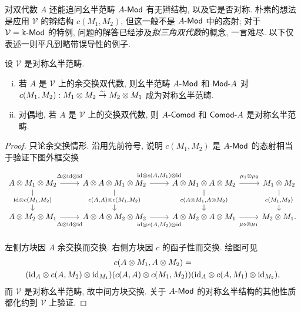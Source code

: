 对双代数 $A$ 还能追问幺半范畴 $A\text{-}\mathsf{Mod}$ 有无辫结构, 以及它是否对称. 朴素的想法是应用 $\mathcal{V}$ 的辫结构 $c(M_1, M_2)$, 但这一般不是 $A\text{-}\mathsf{Mod}$ 中的态射; 对于 $\mathcal{V} = \Bbbk\text{-}\mathsf{Mod}$ 的特例, 问题的解答已经涉及\emph{拟三角双代数}的概念, 一言难尽. 以下仅表述一则平凡到略带误导性的例子.

\begin{proposition}\label{prop:bialgebra-mod-symmetry}
	设 $\mathcal{V}$ 是对称幺半范畴.
	\begin{enumerate}[(i)]
		\item 若 $A$ 是 $\mathcal{V}$ 上的余交换双代数, 则幺半范畴 $A\text{-}\mathsf{Mod}$ 和 $\mathsf{Mod}\text{-}A$ 对 $c(M_1, M_2):  M_1 \otimes M_2 \stackrel{\sim}{\rightarrow} M_2 \otimes M_1$ 成为对称幺半范畴.
	
		\item 对偶地, 若 $A$ 是 $\mathcal{V}$ 上的交换双代数, 则 $A\text{-}\mathsf{Comod}$ 和 $\mathsf{Comod}\text{-}A$ 是对称幺半范畴.
	\end{enumerate}
\end{proposition}
\begin{proof}
	只论余交换情形. 沿用先前符号, 说明 $c(M_1, M_2)$ 是 $A\text{-}\mathsf{Mod}$ 的态射相当于验证下图外框交换
	\[\begin{tikzcd}[row sep=large]
		A \otimes M_1 \otimes M_2 \arrow[r, "{\Delta \otimes \identity \otimes \identity}" inner sep=0.6em] \arrow[d, "{\identity \otimes c(M_1, M_2)}" description] & A \otimes A \otimes M_1 \otimes M_2 \arrow[r, "{\identity \otimes c(A, M_1) \otimes \identity}" inner sep=0.6em] \arrow[d, "{c(A, A) \otimes c(M_1, M_2)}" description] & A \otimes M_1 \otimes A \otimes M_2 \arrow[r, "{\mu_1 \otimes \mu_2}" inner sep=0.6em] \arrow[d, "{c(A \otimes M_1, A \otimes M_2)}" description] & M_1 \otimes M_2 \arrow[d, "{c(M_1, M_2)}" description] \\
		A \otimes M_2 \otimes M_1 \arrow[r, "{\Delta \otimes \identity \otimes \identity}"' inner sep=0.6em] & A \otimes A \otimes M_2 \otimes M_2 \arrow[r, "{\identity \otimes c(A, M_2) \otimes \identity}"' inner sep=0.6em] & A \otimes M_2 \otimes A \otimes M_1 \arrow[r, "{\mu_2 \otimes \mu_1}"' inner sep=0.6em] & M_2 \otimes M_1 .
	\end{tikzcd}\]

	左侧方块因 $A$ 余交换而交换. 右侧方块因 $c$ 的函子性而交换. 绘图可见
	\begin{multline*}
		c(A \otimes M_1, A \otimes M_2) = \\
		(\mathrm{id}_A \otimes c(A, M_2) \otimes \mathrm{id}_{M_1}) (c(A, A) \otimes c(M_1, M_2)) (\mathrm{id}_A \otimes c(A, M_1) \otimes \mathrm{id}_{M_2}),
	\end{multline*}
	而 $\mathcal{V}$ 是对称幺半范畴, 故中间方块交换. 关于 $A\text{-}\mathsf{Mod}$ 的对称幺半结构的其他性质都化约到 $\mathcal{V}$ 上验证.
\end{proof}

